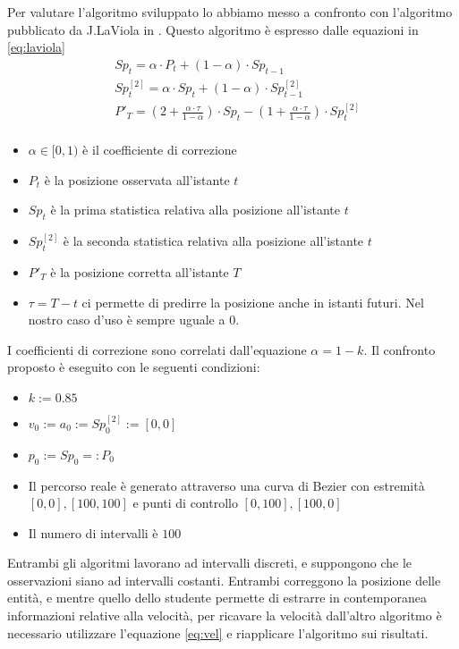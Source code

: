 Per valutare l'algoritmo sviluppato lo abbiamo messo a confronto con l'algoritmo pubblicato da J.LaViola in \cite{laviola}.
Questo algoritmo è espresso dalle equazioni in \ref{eq:laviola}
\begin{equation}
    \label{eq:laviola}
    \begin{split}
        & Sp_t = \alpha \cdot P_t + (1-\alpha) \cdot Sp_{t-1} \\
        & Sp^{[2]}_t = \alpha \cdot Sp_{t} + (1-\alpha) \cdot Sp^{[2]}_{t-1} \\
        & P'_T = \left(2 + \frac{\alpha \cdot \tau}{1 - \alpha}\right) \cdot Sp_t - \left(1 + \frac{\alpha \cdot \tau}{1 - \alpha}\right) \cdot Sp^{[2]}_t \\
    \end{split}
\end{equation}
\begin{itemize}
    \item $\alpha \in [0, 1)$ è il coefficiente di correzione
    \item $P_t$ è la posizione osservata all'istante $t$
    \item $Sp_t$ è la prima statistica relativa alla posizione all'istante $t$
    \item $Sp^{[2]}_t$ è la seconda statistica relativa alla posizione all'istante $t$
    \item $P'_T$ è la posizione corretta all'istante $T$
    \item $\tau = T - t$ ci permette di predirre la posizione anche in istanti futuri. Nel nostro caso d'uso è sempre uguale a 0.
\end{itemize}
I coefficienti di correzione sono correlati dall'equazione $\alpha = 1-k$.
Il confronto proposto è eseguito con le seguenti condizioni:
\begin{itemize}
    \item $k := 0.85$
    \item $v_0 := a_0 := Sp^{[2]}_0 := [0, 0]$
    \item $p_0 := Sp_0 =: P_0$
    \item Il percorso reale è generato attraverso una curva di Bezier con estremità $[0, 0], [100, 100]$ e punti di controllo $[0, 100], [100, 0]$
    \item Il numero di intervalli è $100$
\end{itemize}
Entrambi gli algoritmi lavorano ad intervalli discreti, e suppongono che le osservazioni siano ad intervalli costanti.
Entrambi correggono la posizione delle entità, e mentre quello dello studente permette di estrarre in contemporanea informazioni relative alla velocità, per ricavare la velocità dall'altro algoritmo è necessario utilizzare l'equazione \ref{eq:vel} e riapplicare l'algoritmo sui risultati.

